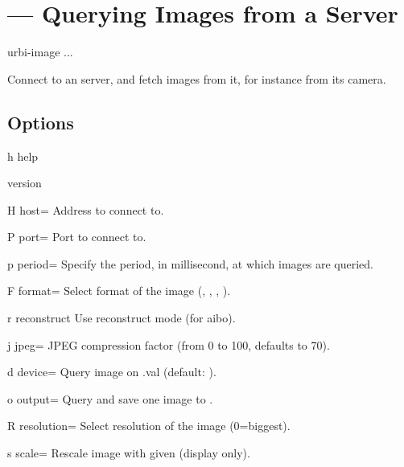 \section{ --- Querying Images from a Server}
\label{sec:tools:urbi-image}

\begin{shell}
urbi-image ...
\end{shell}

Connect to an \urbi server, and fetch images from it, for instance
from its camera.

\subsection{Options}

\begin{options}
\item[h]{help} \optionHelp
\item{version} \optionVersion
\end{options}

\begin{options}[Networking]
\item[H]{host=} Address to connect to.
\item[P]{port=} Port to connect to.
\end{options}

\begin{options}[Tuning]
\item[p]{period=} Specify the period, in millisecond, at
  which images are queried.
\item[F]{format=} Select format of the image (,
  , , ).
\item[r]{reconstruct} Use reconstruct mode (for aibo).
\item[j]{jpeg=} JPEG compression factor (from 0 to 100,
  defaults to 70).
\item[d]{device=} Query image on .val
  (default: ).
\item[o]{output=} Query and save one image to .
\item[R]{resolution=} Select resolution of the image
  (0=biggest).
\item[s]{scale=} Rescale image with given 
  (display only).
\end{options}


